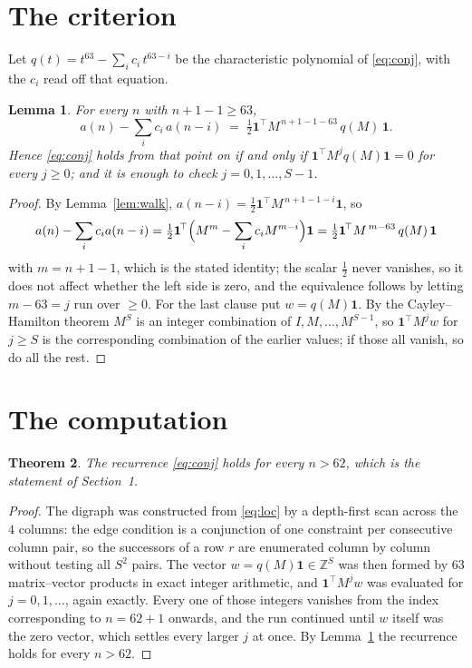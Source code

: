 \documentclass[11pt,a4paper]{article}
\theoremstyle{plain}
\newtheorem{theorem}{Theorem}
\newtheorem{lemma}[theorem]{Lemma}
\theoremstyle{definition}
\begin{document}
\section{The criterion}

Let $q(t)=t^{63}-\sum_i c_i\,t^{63-i}$ be the characteristic polynomial of
\eqref{eq:conj}, with the $c_i$ read off that equation.

\begin{lemma}\label{lem:crit}
For every $n$ with $n+1-1\ge63$,
\[
a(n)-\sum_i c_i\,a(n-i)\;=\;\tfrac1{2}\mathbf{1}^{\!\top}M^{\,n+1-1-63}\,q(M)\,\mathbf{1} .
\]
Hence \eqref{eq:conj} holds from that point on if and only if
$\mathbf{1}^{\!\top}M^{j}q(M)\mathbf{1}=0$ for every $j\ge0$; and it is enough to check
$j=0,1,\dots,S-1$.
\end{lemma}

\begin{proof}
By Lemma~\ref{lem:walk}, $a(n-i)=\tfrac1{2}\mathbf{1}^{\!\top}M^{\,n+1-1-i}\mathbf{1}$, so
\[
a(n)-\sum_i c_i a(n-i)
=\tfrac1{2}\mathbf{1}^{\!\top}\Bigl(M^{m}-\sum_i c_i M^{m-i}\Bigr)\mathbf{1}
=\tfrac1{2}\mathbf{1}^{\!\top}M^{\,m-63}\,q(M)\,\mathbf{1}
\]
with $m=n+1-1$, which is the stated identity; the scalar $\tfrac1{2}$ never vanishes, so it does not affect whether the left side is zero, and the equivalence follows by letting
$m-63=j$ run over $\ge0$. For the last clause put $w=q(M)\mathbf{1}$. By the
Cayley--Hamilton theorem $M^{S}$ is an integer combination of $I,M,\dots,M^{S-1}$, so
$\mathbf{1}^{\!\top}M^{j}w$ for $j\ge S$ is the corresponding combination of the earlier
values; if those all vanish, so do all the rest.
\end{proof}

\section{The computation}

\begin{theorem}
The recurrence \eqref{eq:conj} holds for every $n>62$, which is the statement of
Section~1.
\end{theorem}

\begin{proof}
The digraph was constructed from \eqref{eq:loc} by a depth-first scan across the $4$
columns: the edge condition is a conjunction of one constraint per consecutive column
pair, so the successors of a row $r$ are enumerated column by column without testing all
$S^2$ pairs. The vector $w=q(M)\mathbf{1}\in\mathbb{Z}^{S}$ was then formed by $63$
matrix--vector products in exact integer arithmetic, and $\mathbf{1}^{\!\top}M^{j}w$ was
evaluated for $j=0,1,\dots$, again exactly. Every one of those integers vanishes from the
index corresponding to $n=62+1$ onwards, and the run continued until $w$ itself was the
zero vector, which settles every larger $j$ at once. By Lemma~\ref{lem:crit} the recurrence
holds for every $n>62$.
\end{proof}
\end{document}
